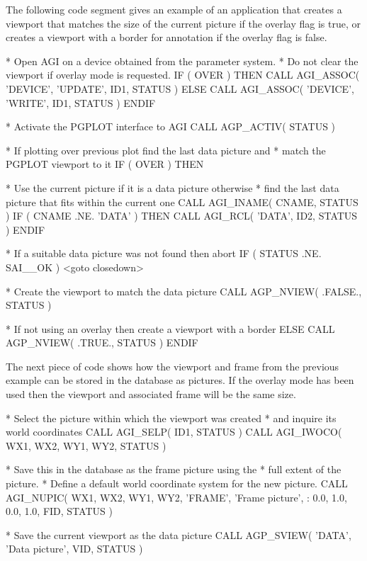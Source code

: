 \documentclass[twoside,11pt,nolof]{starlink}
\begin{document}
The following code segment gives an example of an application that
creates a viewport that matches the size of the current picture if the
overlay flag is true, or creates a viewport with a border for annotation
if the overlay flag is false.
\begin{terminalv}
    *   Open AGI on a device obtained from the parameter system.
    *   Do not clear the viewport if overlay mode is requested.
          IF ( OVER ) THEN
             CALL AGI_ASSOC( 'DEVICE', 'UPDATE', ID1, STATUS )
          ELSE
             CALL AGI_ASSOC( 'DEVICE', 'WRITE', ID1, STATUS )
          ENDIF

    *   Activate the PGPLOT interface to AGI
          CALL AGP_ACTIV( STATUS )

    *   If plotting over previous plot find the last data picture and
    *   match the PGPLOT viewport to it
          IF ( OVER ) THEN

    *   Use the current picture if it is a data picture otherwise
    *   find the last data picture that fits within the current one
             CALL AGI_INAME( CNAME, STATUS )
             IF ( CNAME .NE. 'DATA' ) THEN
                CALL AGI_RCL( 'DATA', ID2, STATUS )
             ENDIF

    *   If a suitable data picture was not found then abort
             IF ( STATUS .NE. SAI__OK ) <goto closedown>

    *   Create the viewport to match the data picture
             CALL AGP_NVIEW( .FALSE., STATUS )

    *   If not using an overlay then create a viewport with a border
          ELSE
             CALL AGP_NVIEW( .TRUE., STATUS )
          ENDIF
\end{terminalv}

The next piece of code shows how the viewport and frame from the previous
example can be stored in the database as pictures. If the overlay mode has
been used then the viewport and associated frame will be the same size.
\begin{terminalv}
    *   Select the picture within which the viewport was created
    *   and inquire its world coordinates
          CALL AGI_SELP( ID1, STATUS )
          CALL AGI_IWOCO( WX1, WX2, WY1, WY2, STATUS )

    *   Save this in the database as the frame picture using the
    *   full extent of the picture.
    *   Define a default world coordinate system for the new picture.
          CALL AGI_NUPIC( WX1, WX2, WY1, WY2, 'FRAME', 'Frame picture',
         :                0.0, 1.0, 0.0, 1.0, FID, STATUS )

    *   Save the current viewport as the data picture
          CALL AGP_SVIEW( 'DATA', 'Data picture', VID, STATUS )
\end{terminalv}
\end{document}
